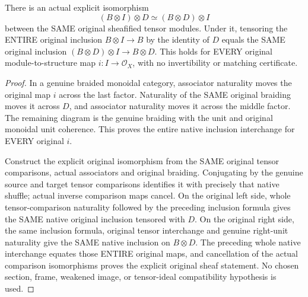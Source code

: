 \begin{theorem}\label{sc0-tensor-ideal-shuffle:whole-shuffle}
\leanok
{}
There is an actual explicit isomorphism
\[
 (B\otimes I)\otimes D\simeq (B\otimes D)\otimes I
\]
between the SAME original sheafified tensor modules. Under it, tensoring the ENTIRE original inclusion $B\otimes I\to B$ by the identity of $D$ equals the SAME original inclusion $(B\otimes D)\otimes I\to B\otimes D$. This holds for EVERY original module-to-structure map $i:I\to\mathcal O_X$, with no invertibility or matching certificate.
\end{theorem}
\begin{proof}
In a genuine braided monoidal category, associator naturality moves the original map $i$ across the last factor. Naturality of the SAME original braiding moves it across $D$, and associator naturality moves it across the middle factor. The remaining diagram is the genuine braiding with the unit and original monoidal unit coherence. This proves the entire native inclusion interchange for EVERY original $i$.

Construct the explicit original isomorphism from the SAME original tensor comparisons, actual associators and original braiding. Conjugating by the genuine source and target tensor comparisons identifies it with precisely that native shuffle; actual inverse comparison maps cancel. On the original left side, whole tensor-comparison naturality followed by the preceding inclusion formula gives the SAME native original inclusion tensored with $D$. On the original right side, the same inclusion formula, original tensor interchange and genuine right-unit naturality give the SAME native inclusion on $B\otimes D$. The preceding whole native interchange equates those ENTIRE original maps, and cancellation of the actual comparison isomorphisms proves the explicit original sheaf statement. No chosen section, frame, weakened image, or tensor-ideal compatibility hypothesis is used.
\end{proof}

